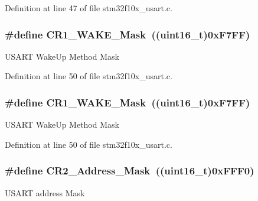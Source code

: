 Definition at line 47 of file stm32f10x\+\_\+usart.\+c.

\subsubsection[{\texorpdfstring{C\+R1\+\_\+\+W\+A\+K\+E\+\_\+\+Mask}{CR1_WAKE_Mask}}]{\setlength{\rightskip}{0pt plus 5cm}\#define C\+R1\+\_\+\+W\+A\+K\+E\+\_\+\+Mask~(({\bf uint16\+\_\+t})0x\+F7\+F\+F)}\hypertarget{group___u_s_a_r_t___private___defines_gae4045dea092c3cbfe07d14fef39195ce}{}\label{group___u_s_a_r_t___private___defines_gae4045dea092c3cbfe07d14fef39195ce}
U\+S\+A\+RT Wake\+Up Method Mask 

Definition at line 50 of file stm32f10x\+\_\+usart.\+c.

\subsubsection[{\texorpdfstring{C\+R1\+\_\+\+W\+A\+K\+E\+\_\+\+Mask}{CR1_WAKE_Mask}}]{\setlength{\rightskip}{0pt plus 5cm}\#define C\+R1\+\_\+\+W\+A\+K\+E\+\_\+\+Mask~(({\bf uint16\+\_\+t})0x\+F7\+F\+F)}\hypertarget{group___u_s_a_r_t___private___defines_gae4045dea092c3cbfe07d14fef39195ce}{}\label{group___u_s_a_r_t___private___defines_gae4045dea092c3cbfe07d14fef39195ce}
U\+S\+A\+RT Wake\+Up Method Mask 

Definition at line 50 of file stm32f10x\+\_\+usart.\+c.

\subsubsection[{\texorpdfstring{C\+R2\+\_\+\+Address\+\_\+\+Mask}{CR2_Address_Mask}}]{\setlength{\rightskip}{0pt plus 5cm}\#define C\+R2\+\_\+\+Address\+\_\+\+Mask~(({\bf uint16\+\_\+t})0x\+F\+F\+F0)}\hypertarget{group___u_s_a_r_t___private___defines_ga080c343a5a95d4419789b94405c27764}{}\label{group___u_s_a_r_t___private___defines_ga080c343a5a95d4419789b94405c27764}
U\+S\+A\+RT address Mask 

